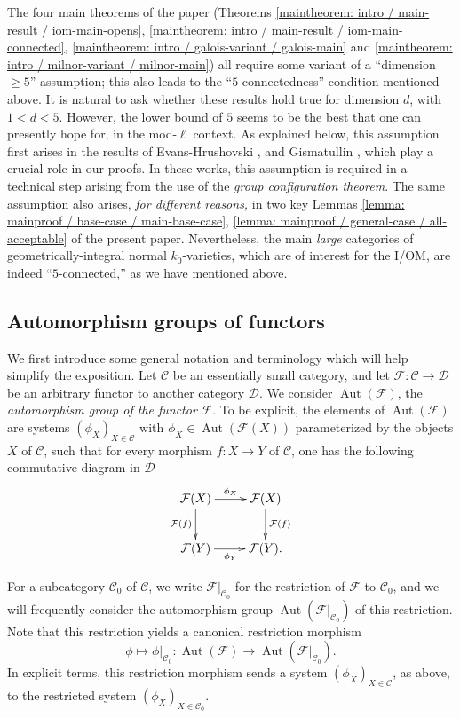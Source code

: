 \documentclass[11pt]{amsart}
\theoremstyle{definition}
\theoremstyle{remark}
\numberwithin{equation}{section}
\DeclareMathOperator{\Aut}{Aut}
\newcommand{\Ccal}{\mathcal{C}}
\newcommand{\Fcal}{\mathcal{F}}
\begin{document}
The four main theorems of the paper (Theorems \ref{maintheorem: intro / main-result / iom-main-opens}, \ref{maintheorem: intro / main-result / iom-main-connected}, \ref{maintheorem: intro / galois-variant / galois-main} and \ref{maintheorem: intro / milnor-variant / milnor-main}) all require some variant of a ``dimension $\geq 5$'' assumption; this also leads to the ``$5$-connectedness'' condition mentioned above.
It is natural to ask whether these results hold true for dimension $d$, with $1 < d < 5$. 
However, the lower bound of $5$ seems to be the best that one can presently hope for, in the mod-$\ell$ context.
As explained below, this assumption first arises in the results of {\sc Evans-Hrushovski} \cite{Evans:1991}, \cite{Evans:1995} and {\sc Gismatullin} \cite{Gismatullin:2008}, which play a crucial role in our proofs.
In these works, this assumption is required in a technical step arising from the use of the \emph{group configuration theorem}.
The same assumption also arises, \emph{for different reasons,} in two key Lemmas \ref{lemma: mainproof / base-case / main-base-case}, \ref{lemma: mainproof / general-case / all-acceptable} of the present paper.
Nevertheless, the main \emph{large} categories of geometrically-integral normal $k_0$-varieties, which are of interest for the I/OM, are indeed ``$5$-connected,'' as we have mentioned above.

\subsection{Automorphism groups of functors}
\label{subsection: intro / automorphism-groups}

We first introduce some general notation and terminology which will help simplify the exposition.
Let $\Ccal$ be an essentially small category, and let $\Fcal : \Ccal \rightarrow \mathcal{D}$ be an arbitrary functor to another category $\mathcal{D}$.
We consider $\Aut(\Fcal)$, the \emph{automorphism group of the functor} $\Fcal$.
To be explicit, the elements of $\Aut(\Fcal)$ are systems $(\phi_X)_{X \in \Ccal}$ with $\phi_X \in \Aut(\Fcal(X))$ parameterized by the objects $X$ of $\Ccal$, such that for every morphism $f : X \rightarrow Y$ of $\Ccal$, one has the following commutative diagram in $\mathcal{D}$
\[
\xymatrix{
  \Fcal(X) \ar[r]^{\phi_X} \ar[d]_{\Fcal(f)} & \Fcal(X) \ar[d]^{\Fcal(f)} \\
  \Fcal(Y) \ar[r]_{\phi_Y} & \Fcal(Y). 
}
\]

For a subcategory $\Ccal_0$ of $\Ccal$, we write $\Fcal|_{\Ccal_0}$ for the restriction of $\Fcal$ to $\Ccal_0$, and we will frequently consider the automorphism group $\Aut(\Fcal|_{\Ccal_0})$ of this restriction.
Note that this restriction yields a canonical restriction morphism
\[\phi \mapsto \phi|_{\Ccal_0} : \Aut(\Fcal) \rightarrow \Aut(\Fcal|_{\Ccal_0}). \]
In explicit terms, this restriction morphism sends a system $(\phi_X)_{X \in \Ccal}$, as above, to the restricted system $(\phi_X)_{X \in \Ccal_0}$.
\end{document}
